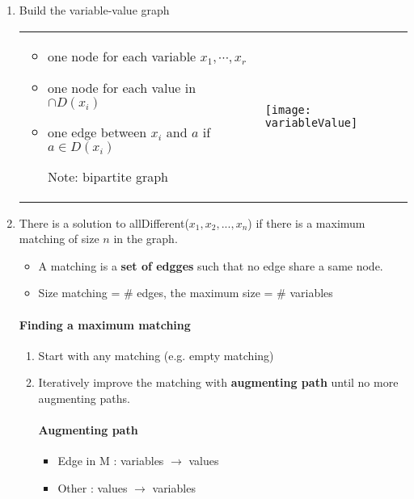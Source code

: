 \begin{enumerate}
    \item Build the variable-value graph 

        \begin{tabular}{m{8cm}m{6cm}}
            \begin{itemize}
                \item one node for each variable $x_1,\cdots, x_r$
                \item one node for each value in $\cap D(x_i)$
                \item one edge between $x_i$ and $a$ if $a \in D(x_i)$
                \item[Note:] bipartite graph
            \end{itemize}
            &
            \texttt{[image: variableValue]}
        \end{tabular}

    \item There is a solution to allDifferent($x_1, x_2, ..., x_n$)
        if there is a maximum matching of size $n$ in the graph.

        \begin{itemize}
            \item A matching is a \textbf{set of edgges} such that
                no edge share a same node. 
            \item Size matching = \# edges, the maximum size = \#
                variables
        \end{itemize}


        \paragraph{Finding a maximum matching}

        \begin{enumerate}
            \item Start with any matching (e.g. empty matching)
            \item Iteratively improve the matching with \textbf{augmenting path}
                until no more augmenting paths.

                \paragraph{Augmenting path}
                \begin{itemize}
                    \item Edge in M : variables $\to$ values
                    \item Other : values $\to$ variables


\end{itemize}
\end{enumerate}
\end{enumerate}
